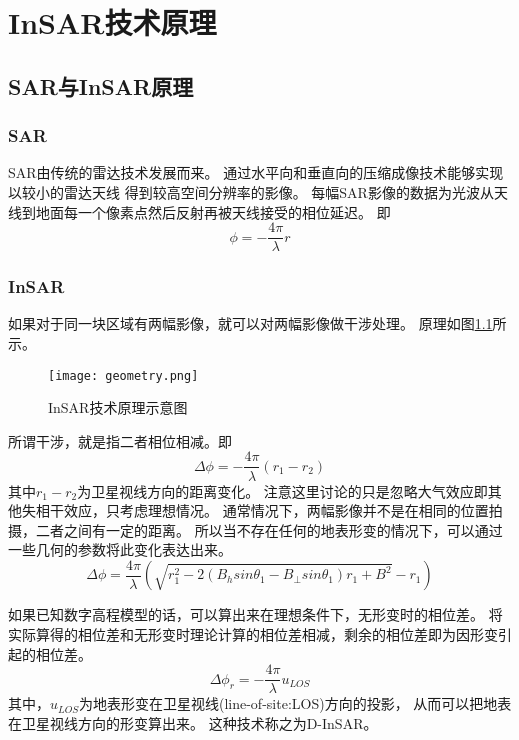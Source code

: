 \chapter{InSAR技术原理}

\section{SAR与InSAR原理}

\subsection{SAR}
SAR由传统的雷达技术发展而来。
通过水平向和垂直向的压缩成像技术能够实现以较小的雷达天线
得到较高空间分辨率的影像。
每幅SAR影像的数据为光波从天线到地面每一个像素点然后反射再被天线接受的相位延迟。
即
\begin{equation}
    \phi=-\frac{4\pi}{\lambda}r
\end{equation}

\subsection{InSAR}
如果对于同一块区域有两幅影像，就可以对两幅影像做干涉处理。
原理如图\ref{fig:geometry}所示。
\begin{figure}[htb!]
    \centering
    \texttt{[image: geometry.png]}
    \caption{InSAR技术原理示意图}
    \label{fig:geometry}
\end{figure}
所谓干涉，就是指二者相位相减。即
\begin{equation}
    \Delta \phi=-\frac{4\pi}{\lambda}(r_1-r_2)
\end{equation}
其中$r_1-r_2$为卫星视线方向的距离变化。
注意这里讨论的只是忽略大气效应即其他失相干效应，只考虑理想情况。
通常情况下，两幅影像并不是在相同的位置拍摄，二者之间有一定的距离。
所以当不存在任何的地表形变的情况下，可以通过一些几何的参数将此变化表达出来。
\begin{equation}
    \Delta \phi=\frac{4\pi}{\lambda}\left(\sqrt{r_1^2−2(B_hsinθ_1−B_{\perp}sinθ_1)r_1+B^2}−r_1\right)
\end{equation}

如果已知数字高程模型的话，可以算出来在理想条件下，无形变时的相位差。
将实际算得的相位差和无形变时理论计算的相位差相减，剩余的相位差即为因形变引起的相位差。
\begin{equation}
    \Delta \phi_{r}=-\frac{4\pi}{\lambda}u_{LOS}
\end{equation}
其中，$u_{LOS}$为地表形变在卫星视线(line-of-site:LOS)方向的投影，
从而可以把地表在卫星视线方向的形变算出来。
这种技术称之为D-InSAR。

